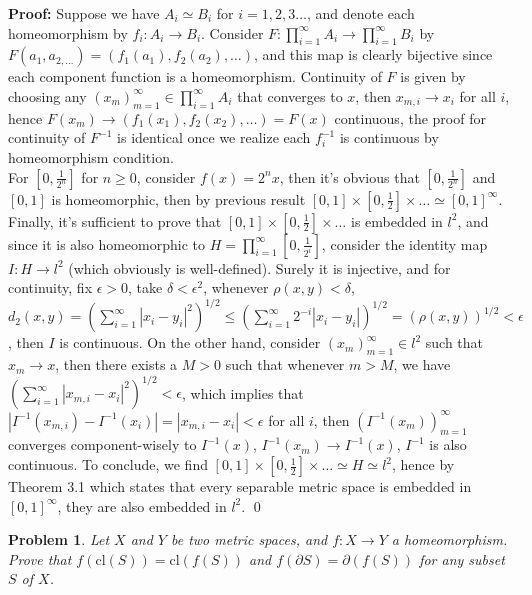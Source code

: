\documentclass[12pt]{article}
\newtheorem{problem}{Problem}
\begin{document}
\textbf{Proof:} Suppose we have $A_{i}\simeq B_{i}$ for $i=1, 2, 3\dots$, and denote each homeomorphism by $f_{i}: A_{i}\to B_{i}$. Consider $F: \prod\limits_{i=1}^{\infty}A_{i}\to \prod\limits_{i=1}^{\infty}B_{i}$ by $F(a_{1}, a_{2, \dots})=(f_{1}(a_{1}), f_{2}(a_{2}),\dots)$, and this map is clearly bijective since each component function is a homeomorphism. Continuity of $F$ is given by choosing any $(x_{m})_{m=1}^{\infty}\in \prod\limits_{i=1}^{\infty}A_{i}$ that converges to $x$, then $x_{m,i}\to x_{i}$ for all $i$, hence $F(x_{m})\to (f_{1}(x_{1}), f_{2}(x_{2}), \dots)=F(x)$ continuous, the proof for continuity of $F^{-1}$ is identical once we realize each $f^{-1}_{i}$ is continuous by homeomorphism condition. \\
\indent For $[0, \frac{1}{2^n}]$ for $n\geq 0$, consider $f(x)=2^{n}x$, then it's obvious that $[0, \frac{1}{2^n}]$ and $[0, 1]$ is homeomorphic, then by previous result $[0, 1]\times [0,\frac{1}{2}]\times\dots\simeq[0, 1]^{\infty}$. Finally, it's sufficient to prove that $[0, 1]\times [0, \frac{1}{2}]\times\dots$ is embedded in $l^{2}$, and since it is also homeomorphic to $H=\prod\limits_{i=1}^{\infty}[0, \frac{1}{2^{i}}]$, consider the identity map $I: H\to l^{2}$ (which obviously is well-defined). Surely it is injective, and for continuity, fix $\epsilon >0$, take $\delta<\epsilon^2$, whenever $\rho(x,y)<\delta$, $d_{2}(x,y)=\left( \sum\limits_{i=1}^{\infty}|x_{i}-y_{i}|^2\right)^{1/2}\leq\left(\sum\limits_{i=1}^{\infty}2^{-i}|x_{i}-y_{i}|\right)^{1/2}=(\rho(x,y))^{1/2}<\epsilon$, then $I$ is continuous. On the other hand, consider $(x_{m})_{m=1}^{\infty}\in l^{2}$ such that $x_{m}\to x$, then there exists a $M>0$ such that whenever $m > M$, we have $\left(\sum\limits_{i=1}^{\infty}|x_{m,i}-x_{i}|^{2}\right)^{1/2}<\epsilon$, which implies that $|I^{-1}(x_{m,i})-I^{-1}(x_{i})|=|x_{m, i}-x_{i}|<\epsilon$ for all $i$, then $(I^{-1}(x_{m}))_{m=1}^{\infty}$ converges component-wisely to $I^{-1}(x)$, $I^{-1}(x_{m})\to I^{-1}(x)$, $I^{-1}$ is also continuous. To conclude, we find $[0, 1]\times [0, \frac{1}{2}]\times\dots\simeq H\simeq l^{2}$, hence by Theorem 3.1 which states that every separable metric space is embedded in $[0,1]^{\infty}$, they are also embedded in $l^{2}$. \qed
\\
\begin{problem}
Let $X$ and $Y$ be two metric spaces, and $f: X\to Y$ a homeomorphism. Prove that $f(\text{cl}(S))=\text{cl}(f(S))$ and $f(\partial S)=\partial(f(S))$ for any subset $S$ of $X$.
\end{problem}
\end{document}
